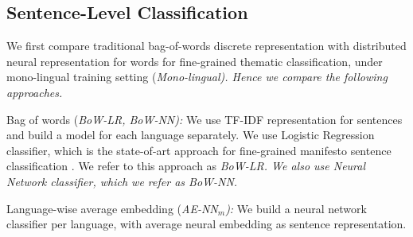 \documentclass[11pt,a4paper]{article}
\newcommand{\tabref}[2][]{Table#1~\ref{#2}\xspace}
\begin{document}
\subsection{Sentence-Level Classification}
We first compare traditional bag-of-words discrete representation with distributed neural representation for words for fine-grained thematic classification, under mono-lingual training setting (\em{Mono-lingual}). \rm Hence we compare the following approaches. 

\begin{description}
\item{Bag of words (\em{BoW-LR}, \em{BoW-NN}):} We use TF-IDF representation for sentences and build a model for each language separately. We use Logistic Regression classifier, which is the state-of-art approach for fine-grained manifesto sentence classification \cite{biessmann2016automating}. We refer to this approach as \em{BoW-LR}. \rm We also use Neural Network classifier, which we refer as \em{BoW-NN}. \rm

\item{Language-wise average embedding (\em{AE-NN$_{m}$}):} \rm We build a neural network classifier per language, with average neural embedding as sentence representation.
\end{description}


\end{document}
